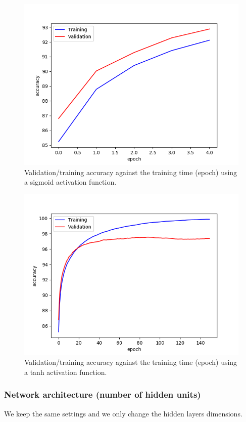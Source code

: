 \documentclass[a4paper]{article}
\begin{document}
\begin{enumerate}
\begin{figure}
\centering
\includegraphics[width=1\textwidth]{epoch2.png}
\caption{\label{fig:sigmoid}Validation/training accuracy against the training time (epoch) using a sigmoid activation function.}
\end{figure}

\begin{figure}
\centering
\includegraphics[width=1\textwidth]{epoch3.png}
\caption{\label{fig:tanh}Validation/training accuracy against the training time (epoch) using a tanh activation function.}
\end{figure}

\subsubsection{Network architecture (number of hidden units)}
We keep the same settings and we only change the hidden layers dimensions.


\end{enumerate}
\end{document}
